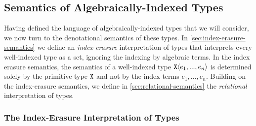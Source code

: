 \subsection{Semantics of Algebraically-Indexed Types}
\label{sec:semantics-algebraically-indexed-types}

Having defined the language of algebraically-indexed types that we
will consider, we now turn to the denotational semantics of these
types. In \autoref{sec:index-erasure-semantics} we define an
\emph{index-erasure} interpretation of types that interprets every
well-indexed type as a set, ignoring the indexing by algebraic
terms. In the index erasure semantics, the semantics of a well-indexed
type $\texttt{X}\langle e_1,...,e_n \rangle$ is determined solely by the primitive
type $\texttt{X}$ and not by the index terms $e_1,...,e_n$. Building
on the index-erasure semantics, we define in
\autoref{sec:relational-semantics} the \emph{relational}
interpretation of types.


\subsubsection{The Index-Erasure Interpretation of Types}
\label{sec:index-erasure-semantics}

